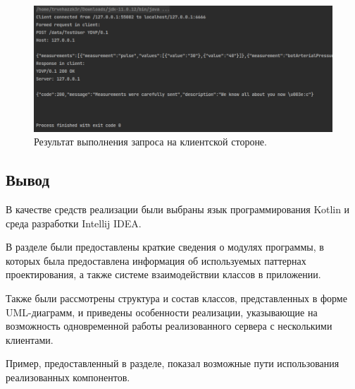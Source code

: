 \begin{figure}[H]
\begin{center}
\includegraphics[width=\textwidth]{img/clientOutput.png}
\captionsetup{justification=centering}
	\caption{Результат выполнения запроса на клиентской стороне. }
	\label{fig:clientOutput}
\end{center}
\end{figure}

\subsection*{Вывод}
В качестве средств реализации были выбраны язык программирования Kotlin и среда разработки Intellij IDEA.

В разделе были предоставлены краткие сведения о модулях программы, в которых была предоставлена информация об используемых паттернах проектирования, а также системе взаимодействии классов в приложении.

Также были рассмотрены структура и состав классов, представленных в форме UML-диаграмм, и приведены особенности реализации, указывающие на возможность одновременной работы реализованного сервера с несколькими клиентами.

Пример, предоставленный в разделе, показал возможные пути использования реализованных компонентов.